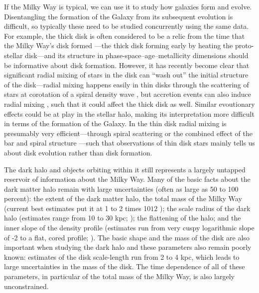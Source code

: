 If the Milky Way is typical, we can use it to study how galaxies form
and evolve. Disentangling the formation of the Galaxy from its
subsequent evolution is difficult, so typically these need to be
studied concurrently using the same data. For example, the thick disk
is often considered to be a relic from the time that the Milky Way's
disk formed \citep{Freeman02a}---the thick disk forming early by
heating the proto-stellar disk---and its structure in
phase-space--age--metallicity dimensions should be informative about
disk formation. However, it has recently become clear that significant
radial mixing of stars in the disk can ``wash out'' the initial
structure of the disk---radial mixing happens easily in thin disks
through the scattering of stars at corotation of a spiral density wave
\citep{sellwood02a}, but accretion events can also induce radial
mixing \citep{Quillen09a}, such that it could affect the thick disk as
well. Similar evoutionary effects could be at play in the stellar
halo, making its interpretation more difficult in terms of the
formation of the Galaxy. In the thin disk radial mixing is presumably
very efficient---through spiral scattering or the combined effect of
the bar and spiral structure \citep{sellwood02a,Minchev09b}---such
that observations of thin disk stars mainly tells us about disk
evolution rather than disk formation.

The dark halo and objects orbiting within it still represents a
largely untapped reservoir of information about the Milky Way. Many of
the basic facts about the dark matter halo remain with large
uncertainties (often as large as 50 to 100\,percent): the extent of
the dark matter halo, the total mass of the Milky Way (current best
estimates put it at 1 to 2 times 10${12}$ \Msol); the scale radius of
the dark halo (estimates range from 10 to 30
kpc; \citealt{Smith07a,Xue08a}); the flattening of the halo; and the
inner slope of the density profile (estimates run from very cuspy
logarithmic slope of -2 to a flat, cored
profile; \citealt{2008gady.book.....B}). The basic shape and the mass
of the disk are also important when studying the dark halo and these
parameters also remain poorly known: estimates of the disk
scale-length run from 2 to 4 kpc, which leads to large uncertainties
in the mass of the disk. The time dependence of all of these
parameters, in particular of the total mass of the Milky Way, is also
largely unconstrained.

